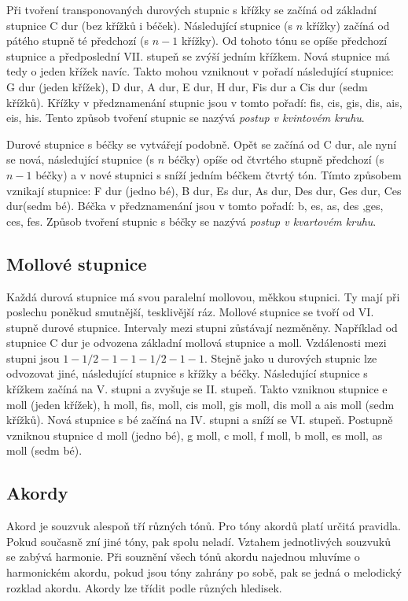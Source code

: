 Při tvoření transponovaných durových stupnic s křížky 
se začíná od základní stupnice C dur (bez křížků i béček).
Následující stupnice (s $n$ křížky) začíná od pátého stupně té předchozí (s $n-1$ křížky).
Od tohoto tónu se opíše předchozí stupnice 
a předposlední VII. stupeň se zvýší jedním křížkem.
Nová stupnice má tedy o jeden křížek navíc.
Takto mohou vzniknout v pořadí následující stupnice: 
G dur (jeden křížek), D dur, A dur, E dur, H dur, Fis dur a Cis dur (sedm křížků).
Křížky v předznamenání stupnic jsou v tomto pořadí:
fis, cis, gis, dis, ais, eis, his.
Tento způsob tvoření stupnic se nazývá \emph{postup v kvintovém kruhu}.
\cite{kofron}
\par

Durové stupnice s béčky se vytvářejí podobně.
Opět se začíná od C dur, ale nyní se nová, 
následující stupnice (s $n$ béčky) opíše od čtvrtého stupně předchozí (s $n-1$ béčky)
a v nové stupnici s sníží jedním béčkem čtvrtý tón.
Tímto způsobem vznikají stupnice:
F dur (jedno bé), B dur, Es dur, As dur, Des dur, Ges dur, Ces dur(sedm bé).
Béčka v předznamenání jsou v tomto pořadí:
b, es, as, des ,ges, ces, fes.
Způsob tvoření stupnic s béčky se nazývá \emph{postup v kvartovém kruhu}.
\cite{kofron}
\par

\subsection{Mollové stupnice}
Každá durová stupnice má svou paralelní mollovou, měkkou stupnici.
Ty mají při poslechu poněkud smutnější, tesklivější ráz.
Mollové stupnice se tvoří od VI. stupně durové stupnice.
Intervaly mezi stupni zůstávají nezměněny.
Například od stupnice C dur je odvozena základní mollová stupnice a moll.
Vzdálenosti mezi stupni jsou $1 - 1/2 - 1 - 1 - 1/2 - 1 - 1$.
Stejně jako u durových stupnic lze odvozovat jiné, 
následující stupnice s křížky a béčky.
Následující stupnice s křížkem začíná na V. stupni a zvyšuje se II. stupeň.
Takto vzniknou stupnice e moll (jeden křížek), h moll, fis, moll, cis moll, gis moll, dis moll a ais moll (sedm křížků).
Nová stupnice s bé začíná na IV. stupni a sníží se VI. stupeň.
Postupně vzniknou stupnice d moll (jedno bé), g moll, c moll, f moll, b moll, es moll, as moll (sedm bé).
\cite{kofron}
\par

\subsection{Akordy}
Akord je souzvuk alespoň tří různých tónů.
Pro tóny akordů platí určitá pravidla.
Pokud současně zní jiné tóny, pak spolu neladí.
Vztahem jednotlivých souzvuků se zabývá harmonie.
Při souznění všech tónů akordu najednou mluvíme o harmonickém akordu,
pokud jsou tóny zahrány po sobě, pak se jedná o melodický rozklad akordu.
Akordy lze třídit podle různých hledisek.
\cite{zenkl}

